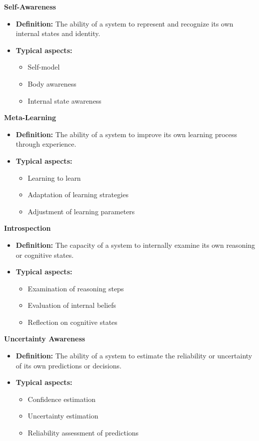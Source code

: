 \documentclass{book}
\providecommand{\ProjectDeepHeading}[2]{%
    \par\medskip\noindent\textbf{#2}\par\smallskip
}
\begin{document}
    
    \ProjectDeepHeading{4}{Self-Awareness}
    \begin{itemize}
        \item \textbf{Definition:} The ability of a system to represent and recognize its own internal states and identity.
        \item \textbf{Typical aspects:}
        \begin{itemize}
            \item Self-model
            \item Body awareness
            \item Internal state awareness
        \end{itemize}
    \end{itemize}
    
    
    \ProjectDeepHeading{4}{Meta-Learning}
    \begin{itemize}
        \item \textbf{Definition:} The ability of a system to improve its own learning process through experience.
        \item \textbf{Typical aspects:}
        \begin{itemize}
            \item Learning to learn
            \item Adaptation of learning strategies
            \item Adjustment of learning parameters
        \end{itemize}
    \end{itemize}
    
    
    \ProjectDeepHeading{4}{Introspection}
    \begin{itemize}
        \item \textbf{Definition:} The capacity of a system to internally examine its own reasoning or cognitive states.
        \item \textbf{Typical aspects:}
        \begin{itemize}
            \item Examination of reasoning steps
            \item Evaluation of internal beliefs
            \item Reflection on cognitive states
        \end{itemize}
    \end{itemize}
    
    
    \ProjectDeepHeading{4}{Uncertainty Awareness}
    \begin{itemize}
        \item \textbf{Definition:} The ability of a system to estimate the reliability or uncertainty of its own predictions or decisions.
        \item \textbf{Typical aspects:}
        \begin{itemize}
            \item Confidence estimation
            \item Uncertainty estimation
            \item Reliability assessment of predictions
        \end{itemize}
    \end{itemize}
    
\end{document}
